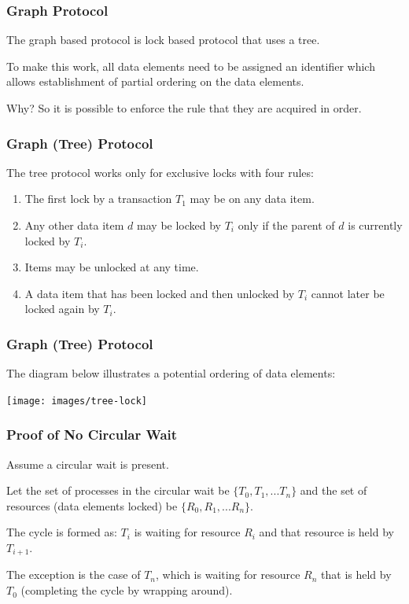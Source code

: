\begin{frame}
\frametitle{Graph Protocol}

The graph based protocol is lock based protocol that uses a tree. 

To make this work, all data elements need to be assigned an identifier which allows establishment of partial ordering on the data elements. 

Why? So it is possible to enforce the rule that they are acquired in order.


\end{frame}

\begin{frame}
\frametitle{Graph (Tree) Protocol}

The tree protocol works only for exclusive locks with four rules:

\begin{enumerate}
	\item The first lock by a transaction $T_{1}$ may be on any data item.
	\item Any other data item $d$ may be locked by $T_{i}$ only if the parent of $d$ is currently locked by $T_{i}$.
	\item Items may be unlocked at any time.
	\item A data item that has been locked and then unlocked by $T_{i}$ cannot later be locked again by $T_{i}$.
\end{enumerate}

\end{frame}


\begin{frame}
\frametitle{Graph (Tree) Protocol}

The diagram below illustrates a potential ordering of data elements:

\begin{center}
\texttt{[image: images/tree-lock]}
\end{center}

\end{frame}


\begin{frame}
\frametitle{Proof of No Circular Wait}

Assume a circular wait is present. 

Let the set of processes in the circular wait be $\{T_{0}, T_{1}, ... T_{n}\}$ and the set of resources (data elements locked) be $\{R_{0}, R_{1}, ... R_{n}\}$. 

The cycle is formed as: $T_{i}$ is waiting for resource $R_{i}$ and that resource is held by $T_{i+1}$. 

The exception is the case of $T_{n}$, which is waiting for resource $R_{n}$ that is held by $T_{0}$ (completing the cycle by wrapping around). 

\end{frame}



